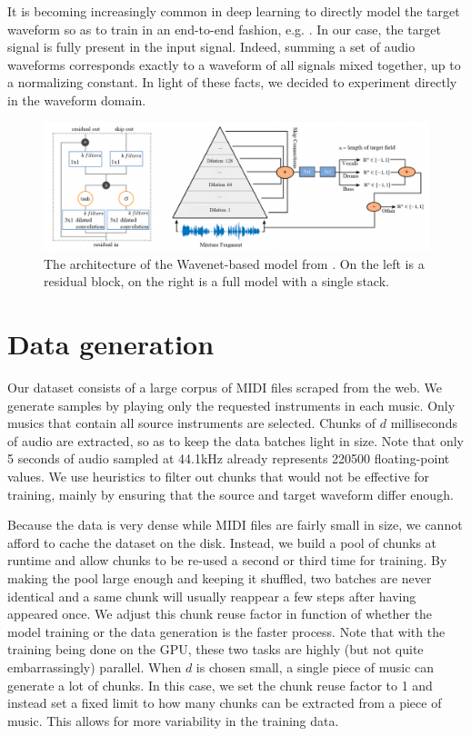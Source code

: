 \documentclass[twocolumn,superscriptaddress,aps]{revtex4-1}
\begin{document}
It is becoming increasingly common in deep learning to directly model the target waveform so as to train in an end-to-end fashion, e.g. \cite{Tacotron2, WaveRNN}. In our case, the target signal is fully present in the input signal. Indeed, summing a set of audio waveforms corresponds exactly to a waveform of all signals mixed together, up to a normalizing constant. In light of these facts, we decided to experiment directly in the waveform domain.

\begin{figure}[t]
	\centering
	\includegraphics[width=.9\linewidth]{arch.png}
	\caption{The architecture of the Wavenet-based model from \cite{SourceSeparationWaveformDomain}. On the left is a residual block, on the right is a full model with a single stack.}
	\label{arch}
\end{figure}

\section{Data generation}
Our dataset consists of a large corpus of MIDI files scraped from the web. We generate samples by playing only the requested instruments in each music. Only musics that contain all source instruments are selected. Chunks of $d$ milliseconds of audio are extracted, so as to keep the data batches light in size. Note that only 5 seconds of audio sampled at 44.1kHz already represents 220500 floating-point values. We use heuristics to filter out chunks that would not be effective for training, mainly by ensuring that the source and target waveform differ enough.

Because the data is very dense while MIDI files are fairly small in size, we cannot afford to cache the dataset on the disk. Instead, we build a pool of chunks at runtime and allow chunks to be re-used a second or third time for training. By making the pool large enough and keeping it shuffled, two batches are never identical and a same chunk will usually reappear a few steps after having appeared once. We adjust this chunk reuse factor in function of whether the model training or the data generation is the faster process. Note that with the training being done on the GPU, these two tasks are highly (but not quite embarrassingly) parallel. When $d$ is chosen small, a single piece of music can generate a lot of chunks. In this case, we set the chunk reuse factor to 1 and instead set a fixed limit to how many chunks can be extracted from a piece of music. This allows for more variability in the training data.
\end{document}
